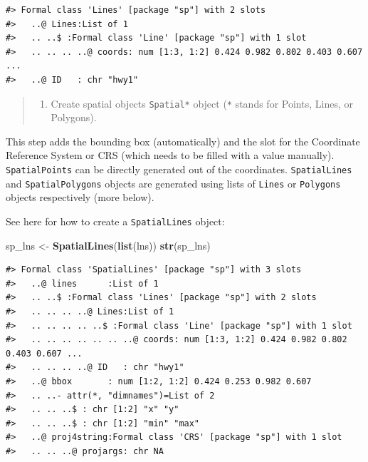 \documentclass[]{book}
\newenvironment{Shaded}{\begin{snugshade}}{\end{snugshade}}
\newcommand{\KeywordTok}[1]{\textcolor[rgb]{0.13,0.29,0.53}{\textbf{#1}}}
\newcommand{\StringTok}[1]{\textcolor[rgb]{0.31,0.60,0.02}{#1}}
\newcommand{\NormalTok}[1]{#1}
\providecommand{\tightlist}{%
  \setlength{\itemsep}{0pt}\setlength{\parskip}{0pt}}
\theoremstyle{definition}
\theoremstyle{definition}
\theoremstyle{definition}
\theoremstyle{remark}
\begin{document}
\begin{verbatim}
#> Formal class 'Lines' [package "sp"] with 2 slots
#>   ..@ Lines:List of 1
#>   .. ..$ :Formal class 'Line' [package "sp"] with 1 slot
#>   .. .. .. ..@ coords: num [1:3, 1:2] 0.424 0.982 0.802 0.403 0.607 ...
#>   ..@ ID   : chr "hwy1"
\end{verbatim}

\begin{quote}
\begin{enumerate}
\def\labelenumi{\Roman{enumi}.}
\setcounter{enumi}{1}
\tightlist
\item
  Create spatial objects \texttt{Spatial*} object (\texttt{*} stands for
  Points, Lines, or Polygons).
\end{enumerate}
\end{quote}

This step adds the bounding box (automatically) and the slot for the
Coordinate Reference System or CRS (which needs to be filled with a
value manually). \texttt{SpatialPoints} can be directly generated out of
the coordinates. \texttt{SpatialLines} and \texttt{SpatialPolygons}
objects are generated using lists of \texttt{Lines} or \texttt{Polygons}
objects respectively (more below).

See here for how to create a \texttt{SpatialLines} object:

\begin{Shaded}
\begin{Highlighting}[]
\NormalTok{sp_lns <-}\StringTok{ }\KeywordTok{SpatialLines}\NormalTok{(}\KeywordTok{list}\NormalTok{(lns))}
\KeywordTok{str}\NormalTok{(sp_lns)}
\end{Highlighting}
\end{Shaded}

\begin{verbatim}
#> Formal class 'SpatialLines' [package "sp"] with 3 slots
#>   ..@ lines      :List of 1
#>   .. ..$ :Formal class 'Lines' [package "sp"] with 2 slots
#>   .. .. .. ..@ Lines:List of 1
#>   .. .. .. .. ..$ :Formal class 'Line' [package "sp"] with 1 slot
#>   .. .. .. .. .. .. ..@ coords: num [1:3, 1:2] 0.424 0.982 0.802 0.403 0.607 ...
#>   .. .. .. ..@ ID   : chr "hwy1"
#>   ..@ bbox       : num [1:2, 1:2] 0.424 0.253 0.982 0.607
#>   .. ..- attr(*, "dimnames")=List of 2
#>   .. .. ..$ : chr [1:2] "x" "y"
#>   .. .. ..$ : chr [1:2] "min" "max"
#>   ..@ proj4string:Formal class 'CRS' [package "sp"] with 1 slot
#>   .. .. ..@ projargs: chr NA
\end{verbatim}
\end{document}
